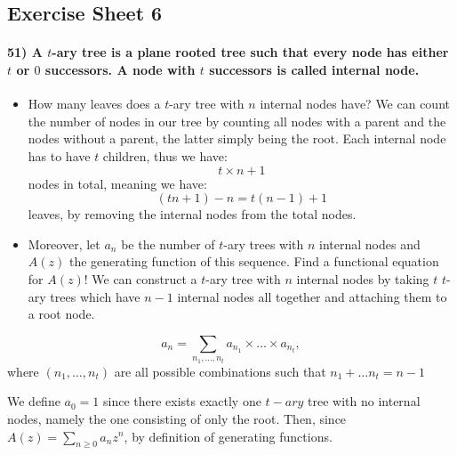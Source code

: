 \documentclass[
]{article}
\begin{document}
\hypertarget{exercise-sheet-6}{%
\subsection{Exercise Sheet 6}\label{exercise-sheet-6}}

\hypertarget{a-t-ary-tree-is-a-plane-rooted-tree-such-that-every-node-has-either-t-or-0-successors.-a-node-with-t-successors-is-called-internal-node.}{%
\paragraph{\texorpdfstring{51) A \(t\)-ary tree is a plane rooted tree
such that every node has either \(t\) or \(0\) successors. A node with
\(t\) successors is called internal
node.}{51) A t-ary tree is a plane rooted tree such that every node has either t or 0 successors. A node with t successors is called internal node.}}\label{a-t-ary-tree-is-a-plane-rooted-tree-such-that-every-node-has-either-t-or-0-successors.-a-node-with-t-successors-is-called-internal-node.}}

\begin{itemize}
\item
  How many leaves does a \(t\)-ary tree with \(n\) internal nodes have?
  We can count the number of nodes in our tree by counting all nodes
  with a parent and the nodes without a parent, the latter simply being
  the root. Each internal node has to have \(t\) children, thus we have:
  \[
    t \times n +1
    \] nodes in total, meaning we have: \[
    (t n + 1) - n = t (n-1) + 1
    \] leaves, by removing the internal nodes from the total nodes.
\item
  Moreover, let \(a_n\) be the number of \(t\)-ary trees with \(n\)
  internal nodes and \(A(z)\) the generating function of this sequence.
  Find a functional equation for \(A(z)\)! We can construct a \(t\)-ary
  tree with \(n\) internal nodes by taking \(t\) \(t\)-ary trees which
  have \(n-1\) internal nodes all together and attaching them to a root
  node.
\end{itemize}

\[
a_n = \sum_{n_1, \dots, n_t} a_{n_1} \times \dots \times a_{n_t},
\] where \((n_1, \dots, n_t)\) are all possible combinations such that
\(n_1 + \dots n_t = n-1\)

We define \(a_0=1\) since there exists exactly one \(t-ary\) tree with
no internal nodes, namely the one consisting of only the root. Then,
since \(A(z) = \sum_{n \geq 0} a_n z^n\), by definition of generating
functions.
\end{document}
